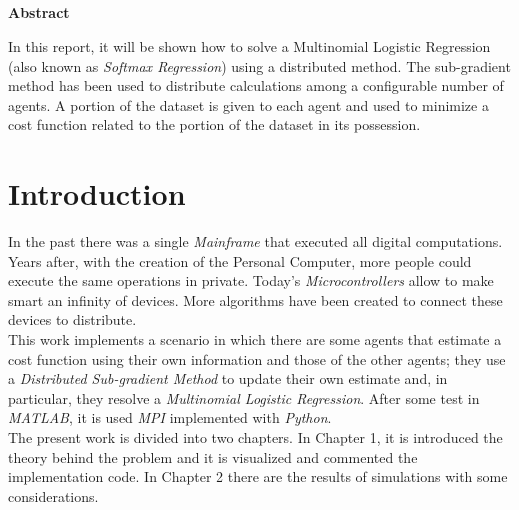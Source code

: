 \documentclass[a4paper,11pt,oneside]{book}
\begin{document}
\pagestyle{myheadings}



\newpage
\thispagestyle{empty}

\begin{center}
\chapter*{}
\thispagestyle{empty}
{\Huge \textbf{Abstract}}\\
\vspace{15mm}
\end{center}
In this report, it will be shown how to solve a Multinomial Logistic Regression (also known as \textit{Softmax Regression}) using a distributed method. The sub-gradient method has been used to distribute calculations among a configurable number of agents. A portion of the dataset is given to each agent and used to minimize a cost function related to the portion of the dataset in its possession.


\tableofcontents \thispagestyle{empty}
\listoffigures\thispagestyle{empty}

\chapter*{Introduction}
In the past there was a single \textit{Mainframe} that executed all digital computations. Years after, with the creation of the Personal Computer, more people could execute the same operations in private. Today's \textit{Microcontrollers} allow to make smart an infinity of devices. More algorithms have been created to connect these devices to distribute.\\
This work implements a scenario in which there are some agents that estimate a cost function using their own information and those of the other agents; they use a \textit{Distributed Sub-gradient Method} to update their own estimate and, in particular, they resolve a \textit{Multinomial Logistic Regression}. After some test in \textit{MATLAB}, it is used \textit{MPI} implemented with \textit{Python}.\\
The present work is divided into two chapters. In Chapter 1, it is introduced the theory behind the problem and it is visualized and commented the implementation code. In Chapter 2 there are the results of simulations with some considerations.
\end{document}
